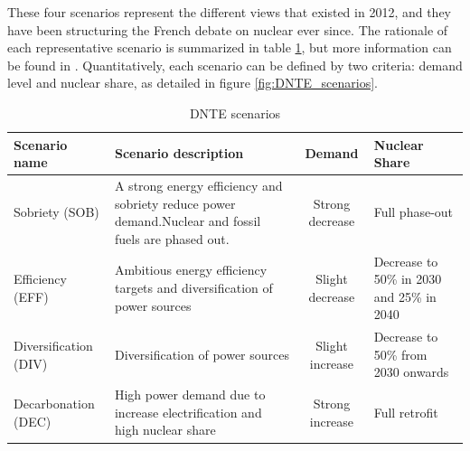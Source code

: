 These four scenarios represent the different views that existed in 2012, and they have been structuring the French debate on nuclear ever since. The rationale of each representative scenario is summarized in table \ref{tab:dnteScenarios}, but more information can be found in \citet{DNTE_gt2}.
Quantitatively, each scenario can be defined by two criteria: demand level and nuclear share, as detailed in figure \ref{fig:DNTE_scenarios}.

\begin{table}
	\begin{tabular}{p{2cm}p{6cm}cp{2.5cm}}
		\toprule
		Scenario name & Scenario description & Demand & Nuclear Share \\
		\midrule
		Sobriety (SOB)     	& A strong energy efficiency and sobriety reduce power demand.\newline Nuclear and fossil fuels are phased out. & Strong decrease & Full phase-out \\
		Efficiency (EFF)  	 & Ambitious energy efficiency targets and diversification of power sources & Slight decrease & Decrease to 50\% in 2030 and 25\% in 2040 \\
		Diversification (DIV) 	& Diversification of power sources & Slight increase & Decrease to 50\% from 2030 onwards \\
		Decarbonation (DEC)  & High power demand due to increase electrification and high nuclear share & Strong increase & Full retrofit \\
		\bottomrule
	\end{tabular}
	\caption{\label{tab:dnteScenarios}DNTE scenarios}
\end{table}


